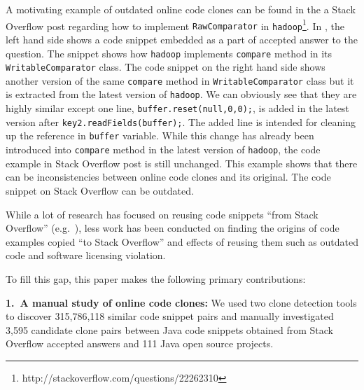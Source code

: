 \documentclass[sigconf,review, anonymous]{acmart}
\begin{document}
A motivating example of outdated online code clones can be found in the a Stack Overflow post regarding how to implement {\small{\texttt{RawComparator}}} in \texttt{hadoop}\footnote{http://stackoverflow.com/questions/22262310}. In , the left hand side shows a code snippet embedded as a part of accepted answer to the question. The snippet shows how {\small{\texttt{hadoop}}} implements {\small{\texttt{compare}}} method in its {\small{\texttt{WritableComparator}}} class. The code snippet on the right hand side shows another version of the same {\small{\texttt{compare}}} method in {\small{\texttt{WritableComparator}}} class but it is extracted from the latest version of {\small{\texttt{hadoop}}}. We can obviously see that they are highly similar except one line, {\small{\verb|buffer.reset(null,0,0);|}}, is added in the latest version after {\small{\verb|key2.readFields(buffer);|}}. The added line is intended for cleaning up the reference in {\small{\verb|buffer|}} variable. While this change has already been introduced into {\small{\texttt{compare}}} method in the latest version of {\small{\texttt{hadoop}}}, the code example in Stack Overflow post is still unchanged. This example shows that there can be inconsistencies between online code clones and its original. The code snippet on Stack Overflow can be outdated.  %

While a lot of research has focused on reusing code snippets ``from Stack Overflow'' (e.g.~\cite{Keivanloo2014,An2017,Yang2016}), less work has been conducted on finding the origins of code examples copied ``to Stack Overflow'' and effects of reusing them such as outdated code and software licensing violation.

To fill this gap, this paper makes the following  primary contributions:

\vspace{0.5ex}%
\noindent\textbf{1.~A manual study of online code clones:} 
We used two clone detection tools to discover 315,786,118 similar code snippet pairs and manually investigated 3,595 candidate clone pairs between Java code snippets obtained from Stack Overflow accepted answers and 111 Java open source projects.
\end{document}
